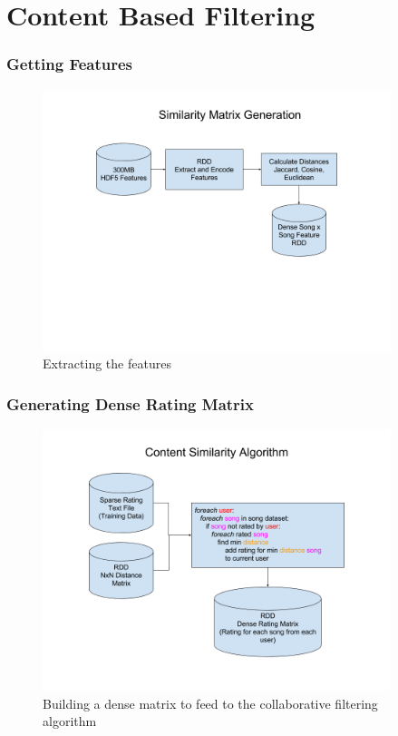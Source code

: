 \documentclass[11pt]{beamer}
\begin{document}
  \section{Content Based Filtering}
  \begin{frame}
    \frametitle{Getting Features}
    \begin{figure}[h]
      \centering
      \includegraphics[width=4in]{figures/similarity_matrix.png}
      \caption{Extracting the features}
      \label{fig:similarity_matrix}
    \end{figure}
  \end{frame}

  \begin{frame}
    \frametitle{Generating Dense Rating Matrix}
    \begin{figure}[h]
      \centering
      \includegraphics[width=4in]{figures/content_similarity_algorithm.png}
      \caption{Building a dense matrix to feed to the collaborative filtering algorithm}
      \label{fig:content_similarity_algorithm}
    \end{figure}
  \end{frame}
\end{document}
